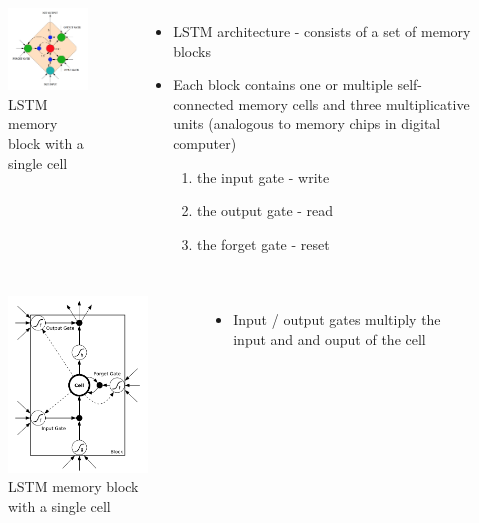 \documentclass{beamer}
\begin{document}
\frame
{
	\begin{columns}
		\begin{figure}[ht]  
			\begin{center}
				\includegraphics[width=2.1in]{Images/LSTM.png}   
			\end{center}   
			\caption{\centering LSTM memory block with a single cell}
		\end{figure}
		\begin{itemize}
		\item LSTM architecture - consists of a set of memory blocks	
		\item Each block contains one or multiple self-connected memory cells and three multiplicative units	(analogous to memory chips in digital computer)
			\begin{enumerate}
			\item the input gate - write
			\item the output gate - read
			\item the forget gate - reset
			\end{enumerate}
		\end{itemize}
	\end{columns}
}
\frame
{
	\begin{columns}
		\column{0.5\textwidth}
		\begin{figure}[ht]  
			\begin{center}
				\includegraphics[width=1.8in]{Images/LSTM_detail.png}   
			\end{center}   
			\caption{\centering LSTM memory block with a single cell}
		\end{figure}
		\column{0.4\textwidth} 
		\begin{itemize}
		\item Input / output gates multiply the input and and ouput of the cell 
		\end{itemize}
	\end{columns}
}
\end{document}
